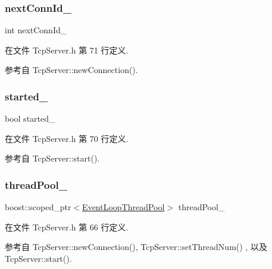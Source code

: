 \subsubsection{\texorpdfstring{next\+Conn\+Id\+\_\+}{nextConnId\_}}
{\footnotesize\ttfamily int next\+Conn\+Id\+\_\+\hspace{0.3cm}{\ttfamily [private]}}



在文件 Tcp\+Server.\+h 第 71 行定义.



参考自 Tcp\+Server\+::new\+Connection().

\mbox{\label{classmuduo_1_1TcpServer_a5ad69cfc4163d7797bc0f0d7eadb95a7}} 
\subsubsection{\texorpdfstring{started\+\_\+}{started\_}}
{\footnotesize\ttfamily bool started\+\_\+\hspace{0.3cm}{\ttfamily [private]}}



在文件 Tcp\+Server.\+h 第 70 行定义.



参考自 Tcp\+Server\+::start().

\mbox{\label{classmuduo_1_1TcpServer_a734d140bc9fcb5fe26e93dd0a42cf775}} 
\subsubsection{\texorpdfstring{thread\+Pool\+\_\+}{threadPool\_}}
{\footnotesize\ttfamily boost\+::scoped\+\_\+ptr$<$\hyperlink{classmuduo_1_1EventLoopThreadPool}{Event\+Loop\+Thread\+Pool}$>$ thread\+Pool\+\_\+\hspace{0.3cm}{\ttfamily [private]}}



在文件 Tcp\+Server.\+h 第 66 行定义.



参考自 Tcp\+Server\+::new\+Connection(), Tcp\+Server\+::set\+Thread\+Num() , 以及 Tcp\+Server\+::start().

